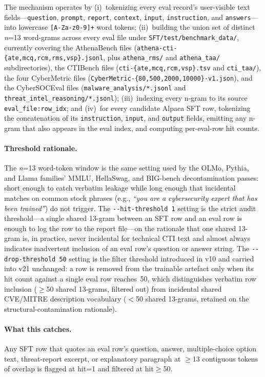 \documentclass[webpdf,contemporary,large]{oup-authoring-template}
\providecommand{\hfid}[1]{{\small\nolinkurl{#1}}}
\theoremstyle{thmstyleone}
\theoremstyle{thmstyletwo}
\theoremstyle{thmstylethree}
\begin{document}
The mechanism operates by (i)~tokenizing every eval record's user-visible text fields---\texttt{question}, \texttt{prompt}, \texttt{report}, \texttt{context}, \texttt{input}, \texttt{instruction}, and \texttt{answers}---into lowercase \hfid{[A-Za-z0-9]+} word tokens; (ii)~building the union set of distinct \emph{n}=13 word-grams across every eval file under \hfid{SFT/test/benchmark_data/}, currently covering the AthenaBench files (\texttt{athena-cti-\{ate,mcq,rcm,rms,vsp\}.jsonl}, plus \hfid{athena_rms/} and \hfid{athena_taa/} subdirectories), the CTIBench files (\texttt{cti-\{ate,mcq,rcm,vsp\}.tsv} and \hfid{cti_taa/}), the four CyberMetric files (\texttt{CyberMetric-\{80,500,2000,10000\}-v1.json}), and the CyberSOCEval files (\hfid{malware_analysis/*.jsonl} and \hfid{threat_intel_reasoning/*.jsonl}); (iii)~indexing every n-gram to its source \hfid{eval_file:row_idx}; and (iv)~for every candidate Alpaca SFT row, tokenizing the concatenation of its \texttt{instruction}, \texttt{input}, and \texttt{output} fields, emitting any n-gram that also appears in the eval index, and computing per-eval-row hit counts.

\paragraph{Threshold rationale.}
The \emph{n}=13 word-token window is the same setting used by the OLMo, Pythia, and Llama families' MMLU, HellaSwag, and BIG-bench decontamination passes: short enough to catch verbatim leakage while long enough that incidental matches on common stock phrases (e.g., \emph{``you are a cybersecurity expert that has been trained''}) do not trigger. The \hfid{--hit-threshold 1} setting is the strict audit threshold---a single shared 13-gram between an SFT row and an eval row is enough to log the row to the report file---on the rationale that one shared 13-gram is, in practice, never incidental for technical CTI text and almost always indicates inadvertent inclusion of an eval row's question or answer string. The \hfid{--drop-threshold 50} setting is the filter threshold introduced in v10 and carried into v21 unchanged: a row is removed from the trainable artefact only when its hit count against a single eval row reaches~50, which distinguishes verbatim row inclusion ($\geq$50 shared 13-grams, filtered out) from incidental shared CVE/MITRE description vocabulary ($<$50 shared 13-grams, retained on the structural-contamination rationale).

\paragraph{What this catches.}
Any SFT row that quotes an eval row's question, answer, multiple-choice option text, threat-report excerpt, or explanatory paragraph at $\geq$13 contiguous tokens of overlap is flagged at hit=1 and filtered at hit$\geq$50.
\end{document}
